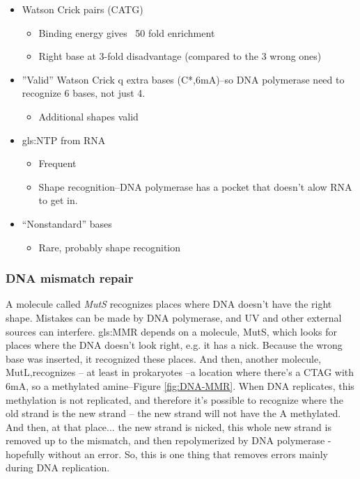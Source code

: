 \documentclass[]{article}
\begin{document}
\begin{itemize}
	\item Watson Crick pairs (CATG)
	\begin{itemize}
		\item  Binding energy gives ~50 fold enrichment
		\item  Right base at 3-fold disadvantage (compared to the 3 wrong ones)
	\end{itemize}
	\item  ''Valid'' Watson Crick q extra bases (C*,6mA)--so DNA polymerase need to recognize 6 bases, not just 4.
	\begin{itemize}
		\item Additional shapes valid
	\end{itemize}
	\item \gls{gls:NTP} from RNA
	\begin{itemize}
		\item Frequent
		\item Shape recognition--DNA polymerase has a pocket that doesn't alow RNA to get in.
	\end{itemize}
	\item “Nonstandard” bases
	\begin{itemize}
		\item Rare, probably shape recognition
	\end{itemize}
\end{itemize}

\subsubsection{DNA mismatch repair}

A molecule called \emph{MutS} recognizes places where DNA doesn't have the right shape. Mistakes can be made by DNA polymerase, and UV and other external sources can interfere.
\gls{gls:MMR} depends on a molecule, MutS, which looks for places where the DNA doesn't look right, e.g. it has a nick. Because the wrong base was inserted,
it recognized these places.
And then, another molecule, MutL,recognizes -- at least in prokaryotes --a location where
there's a CTAG with 6mA, so a methylated amine--Figure \ref{fig:DNA-MMR}.
When DNA replicates, this methylation is not replicated,
and therefore it's possible to recognize where the old strand is the new strand --
the new strand will not have the A methylated.
And then, at that place... the new strand is nicked,
this whole new strand is removed up to the mismatch,
and then repolymerized by DNA polymerase -
hopefully without an error. So, this is one thing that removes errors
mainly during DNA replication.
\end{document}
